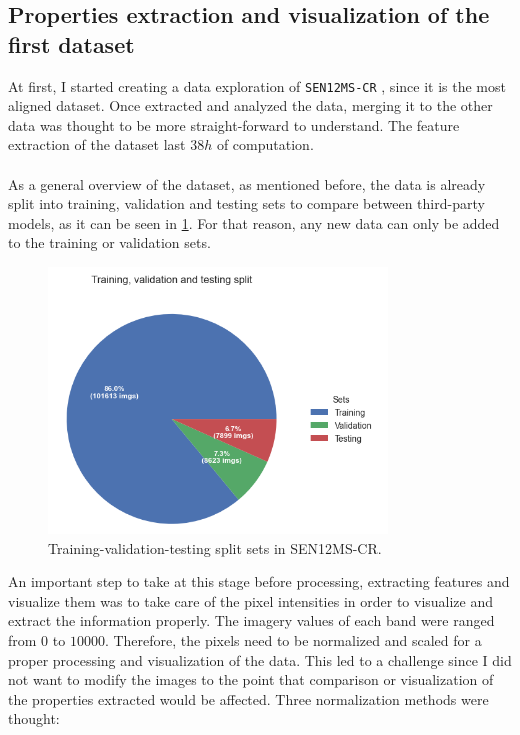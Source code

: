 \subsection{Properties extraction and visualization of the first dataset}
At first, I started creating a data exploration of \texttt{SEN12MS-CR} \cite{sen12mscr}, since it is the most aligned dataset. Once extracted and analyzed the data, merging it to the other data was thought to be more straight-forward to understand. The feature extraction of the dataset last $38 h$ of computation.
\\
\\
As a general overview of the dataset, as mentioned before, the data is already split into training, validation and testing sets to compare between third-party models, as it can be seen in \ref{fig:eda-training-split}. For that reason, any new data can only be added to the training or validation sets. 
\begin{figure}[H]
	\centering
	\includegraphics[width=9cm]{imgs/eda/split}
	\caption{Training-validation-testing split sets in SEN12MS-CR.}
	\label{fig:eda-training-split}
\end{figure}
An important step to take at this stage before processing, extracting features and visualize them was to take care of the pixel intensities in order to visualize and extract the information properly. The imagery values of each band were ranged from $0$ to $10000$. Therefore, the pixels need to be normalized and scaled for a proper processing and visualization of the data. This led to a challenge since I did not want to modify the images to the point that comparison or visualization of the properties extracted would be affected. Three normalization methods were thought:
